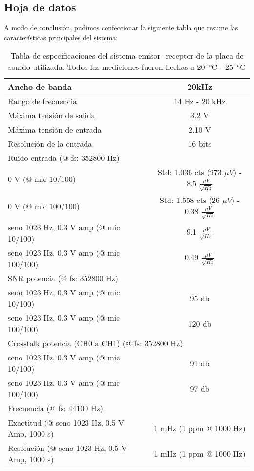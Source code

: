 \documentclass[a4paper, 11pt]{article}
\begin{document}
\subsection*{Hoja de datos}
A modo de conclusión, pudimos confeccionar la siguiente tabla que resume las características principales del sistema:
\begin {table}[H]
\begin {center}
 \begin{tabular} {|l|c|}
        \hline
        Ancho de banda & 20kHz \\
        \hline
        Rango de frecuencia & 14 Hz - 20 kHz\\
        \hline
        Máxima tensión de salida  & 3.2 V\\
        \hline
        Máxima tensión de entrada  & 2.10 V\\
        \hline
        Resolución de la entrada  & 16 bits\\
        \hline
	\multicolumn{2}{|l|}{Ruido entrada (@ fs: 352800 Hz)} \tabularnewline
        \hline
        0 V (@ mic 10/100) & Std: 1.036 cts (973 $\mu V$)  - 8.5 $ \frac{\mu V}{\sqrt{Hz}}$ \\
        0 V (@ mic 100/100) & Std: 1.558 cts (26 $\mu V$) - 0.38 $ \frac{\mu V}{\sqrt{Hz}}$ \\
        \hline
         seno 1023 Hz, 0.3 V amp (@ mic 10/100) & 9.1 $ \frac{\mu V}{\sqrt{Hz}}$\\
	seno 1023 Hz, 0.3 V amp (@ mic 100/100) & 0.49 $ \frac{\mu V}{\sqrt{Hz}}$\\
        \hline
	\multicolumn{2}{|l|}{SNR potencia (@ fs: 352800 Hz)} \tabularnewline
        \hline
         seno 1023 Hz, 0.3 V amp (@ mic 10/100) & 95 db \\
	seno 1023 Hz, 0.3 V amp (@ mic 100/100) & 120 db \\
	\hline
	\multicolumn{2}{|l|}{Crosstalk potencia (CH0 a CH1) (@ fs: 352800 Hz)} \tabularnewline
	\hline
        seno 1023 Hz, 0.3 V amp (@ mic 10/100) & 91 db \\
	seno 1023 Hz, 0.3 V amp (@ mic 100/100) & 97 db \\
        \hline
\multicolumn{2}{|l|}{Frecuencia (@ fs: 44100 Hz) } \tabularnewline
        \hline
	Exactitud (@ seno 1023 Hz, 0.5 V Amp, 1000 s)  & 1 mHz (1 ppm @ 1000 Hz) \\
	Resolución (@ seno 1023 Hz, 0.5 V Amp, 1000 s) & 1 mHz (1 ppm @ 1000 Hz) \\
        \hline
 \end{tabular}
 \caption{Tabla de especificaciones del sistema emisor -receptor de la placa de sonido utilizada. Todos las mediciones fueron hechas a \SI{20}{\celsius} - \SI{25}{\celsius}}
 \label{table1}
 \end{center}
\end{table}
\end{document}

